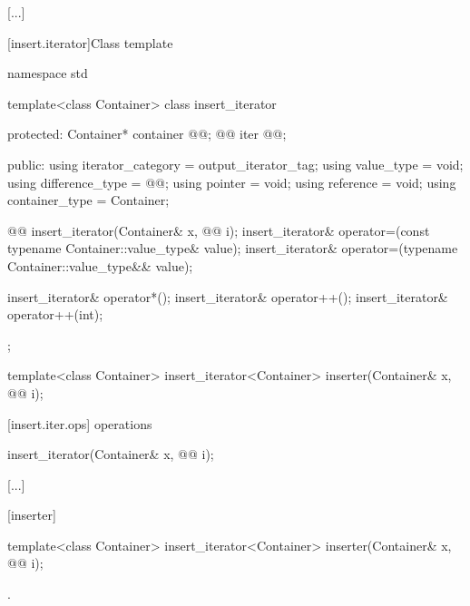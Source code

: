 [...]

[insert.iterator]{Class template }

%
\begin{codeblock}
namespace std {
  template<class Container>
  class insert_iterator {
  protected:
    Container* container @@;
    @@ iter @\added{\{\}}@;

  public:
    using iterator_category = output_iterator_tag;
    using value_type        = void;
    using difference_type   = @@;
    using pointer           = void;
    using reference         = void;
    using container_type    = Container;

    @@
    insert_iterator(Container& x, @@ i);
    insert_iterator& operator=(const typename Container::value_type& value);
    insert_iterator& operator=(typename Container::value_type&& value);

    insert_iterator& operator*();
    insert_iterator& operator++();
    insert_iterator& operator++(int);
  };

  template<class Container>
    insert_iterator<Container> inserter(Container& x, @@ i);
}
\end{codeblock}

[insert.iter.ops]{ operations}

%
\begin{itemdecl}
insert_iterator(Container& x, @@ i);
\end{itemdecl}

[...]

[inserter]{}

%
\begin{itemdecl}
template<class Container>
  insert_iterator<Container> inserter(Container& x, @@ i);
\end{itemdecl}

\begin{itemdescr}
\pnum
\returns
{}.
\end{itemdescr}


